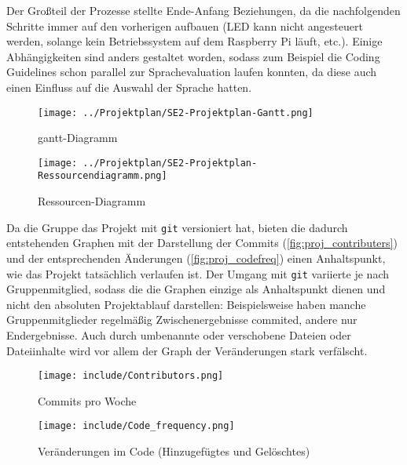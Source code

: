 Der Großteil der Prozesse stellte Ende-Anfang Beziehungen, da die nachfolgenden Schritte immer auf den vorherigen aufbauen (LED kann nicht angesteuert werden, solange kein Betriebssystem auf dem Raspberry Pi läuft, etc.). Einige Abhängigkeiten sind anders gestaltet worden, sodass zum Beispiel die Coding Guidelines schon parallel zur Sprachevaluation laufen konnten, da diese auch einen Einfluss auf die Auswahl der Sprache hatten.

\begin{figure}[!ht]
\centering
\texttt{[image: ../Projektplan/SE2-Projektplan-Gantt.png]}
\caption{gantt-Diagramm}
\label{fig:gantt-diag}
\end{figure}

\begin{figure}[!ht]
\centering
\texttt{[image: ../Projektplan/SE2-Projektplan-Ressourcendiagramm.png]}
\caption{Ressourcen-Diagramm}
\label{fig:ress-diag}
\end{figure}

Da die Gruppe das Projekt mit \texttt{git} versioniert hat, bieten die dadurch entstehenden Graphen mit der Darstellung der Commits (\autoref{fig:proj_contributers}) und der entsprechenden Änderungen (\autoref{fig:proj_codefreq}) einen Anhaltspunkt, wie das Projekt tatsächlich verlaufen ist. Der Umgang mit \texttt{git} variierte je nach Gruppenmitglied, sodass die die Graphen einzige als Anhaltspunkt dienen und nicht den absoluten Projektablauf darstellen: Beispielsweise haben manche Gruppenmitglieder regelmäßig Zwischenergebnisse commited, andere nur Endergebnisse. Auch durch umbenannte oder verschobene Dateien oder Dateiinhalte wird vor allem der Graph der Veränderungen stark verfälscht.

\begin{figure}[!ht]
\centering
\texttt{[image: include/Contributors.png]}
\caption{Commits pro Woche}
\label{fig:proj_contributers}
\end{figure}

\begin{figure}[!ht]
\centering
\texttt{[image: include/Code\_frequency.png]}
\caption{Veränderungen im Code (Hinzugefügtes und Gelöschtes)}
\label{fig:proj_codefreq}
\end{figure}


